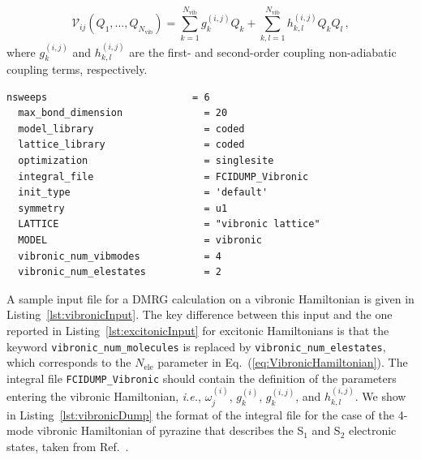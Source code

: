 \documentclass[bibliography=totoc,12pt,a4paper]{scrartcl}
\begin{document}
\begin{equation}
  \mathcal{V}_{ij}(Q_1,\ldots,Q_{N_\text{vib}}) =
   \sum_{k=1}^{N_\text{vib}} g_k^{(i,j)} Q_k
	+ \sum_{k,l=1}^{N_\text{vib}} h_{k,l}^{(i,j)} Q_k Q_l \, ,
  \label{eq:OffDiagonalVibronic}
\end{equation}
%
where $g_k^{(i,j)}$ and $h_{k,l}^{(i,j)}$ are the first- and second-order coupling non-adiabatic coupling terms, respectively.

\begin{lstlisting}[language=qcmaquis,
				   caption={Input example for a vibronic DMRG calculation},
				   label=lst:vibronicInput]
  nsweeps                         = 6
  max_bond_dimension              = 20
  model_library                   = coded
  lattice_library                 = coded
  optimization                    = singlesite
  integral_file                   = FCIDUMP_Vibronic
  init_type                       = 'default'
  symmetry                        = u1
  LATTICE                         = "vibronic lattice"
  MODEL                           = vibronic
  vibronic_num_vibmodes           = 4
  vibronic_num_elestates          = 2
\end{lstlisting}

A sample input file for a DMRG calculation on a vibronic Hamiltonian is given in Listing~\ref{lst:vibronicInput}.
The key difference between this input and the one reported in Listing~\ref{lst:excitonicInput} for excitonic Hamiltonians is that the keyword \texttt{vibronic\_num\_molecules} is replaced by \texttt{vibronic\_num\_elestates}, which corresponds to the $N_\text{ele}$ parameter in Eq.~(\ref{eq:VibronicHamiltonian}).
The integral file \texttt{FCIDUMP\_Vibronic} should contain the definition of the parameters entering the vibronic Hamiltonian, \textit{i.e.}, $\omega_j^{(i)}$, $g_k^{(i)}$, $g_k^{(i,j)}$, and $h_{k,l}^{(i,j)}$.
We show in Listing~\ref{lst:vibronicDump} the format of the integral file for the case of the 4-mode vibronic Hamiltonian of pyrazine that describes the S$_1$ and S$_2$ electronic states, taken from Ref.~.
\end{document}
